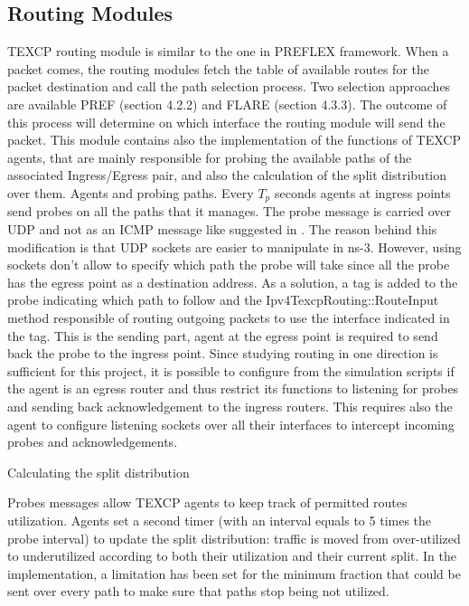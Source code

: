   		\subsection{Routing Modules}

TEXCP routing module is similar to the one in PREFLEX framework. When a packet comes, the routing modules fetch the table of available routes for the packet destination and call the path selection process. Two selection approaches are available PREF (section 4.2.2) and FLARE (section 4.3.3). The outcome of this process will determine on which interface the routing module will send the packet.  This module contains also the implementation of the functions of TEXCP agents, that are mainly responsible for probing the available paths of the associated Ingress/Egress pair, and also the calculation of the split distribution over them.
Agents and probing paths.
Every $T_p$ seconds agents at ingress points send probes on all the paths that it manages.  The probe message is carried over UDP and not as an ICMP message like suggested in \cite{kan1}. The reason behind this modification is that UDP sockets are easier to manipulate in ns-3. However, using sockets don't allow to specify which path the probe will take since all the probe has the egress point as a destination address. As a solution, a tag is added to the probe indicating which path to follow and the Ipv4TexcpRouting::RouteInput method responsible of routing outgoing packets to use the interface indicated in the tag. This is the sending part, agent at the egress point is required to send back the probe to the ingress point. Since studying routing in one direction is sufficient for this project, it is possible to configure from the simulation scripts if the agent is an egress router and thus restrict its functions to listening for probes and sending back acknowledgement to the ingress routers. This requires also the agent to configure listening sockets over all their interfaces to intercept incoming probes and acknowledgements.

Calculating the split distribution 

Probes messages allow TEXCP agents to keep  track of permitted routes utilization. Agents set a second timer (with an interval equals to 5 times the probe interval) to update the split distribution: traffic is moved from over-utilized to underutilized according to both their utilization and their current split. In the implementation, a limitation has been set for the minimum fraction that could be sent over every path to make sure that paths stop being not utilized.

